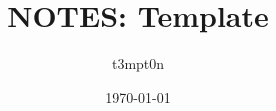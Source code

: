 \documentclass[letterpaper]{article}
\begin{document}
\title{NOTES: Template}
\author{t3mpt0n}
\date{\today}
\maketitle
\end{document}
